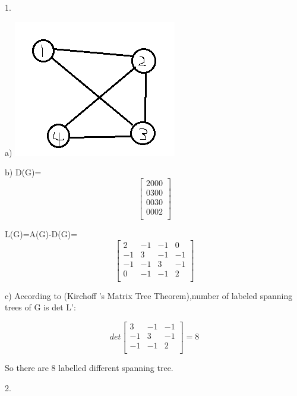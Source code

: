 \documentclass{article}
\begin{document}
1.

a)
\includegraphics[scale=.5]{HW9_a.png}

b)
D(G)=\[
\left[ \begin {array}{ccccc}
2000\\
0300\\
0030\\
0002\\
\end{array} \right]
\]

L(G)=A(G)-D(G)=\[
\left[ \begin {array}{ccccc}
2&{-1}&{-1}&0\\
{-1}&3&{-1}&{-1}\\
{-1}&{-1}&3&{-1}\\
0&{-1}&{-1}&2\\
\end{array} \right]
\]

c)
According to (Kirchoff ’s Matrix Tree Theorem),number of labeled spanning trees of G is det L':

\[det
\left[ \begin {array}{ccccc}
3&{-1}&{-1}\\
{-1}&3&{-1}\\
{-1}&{-1}&2\\
\end{array} \right]
=8\]

So there are 8 labelled different spanning tree.

2.
\end{document}
